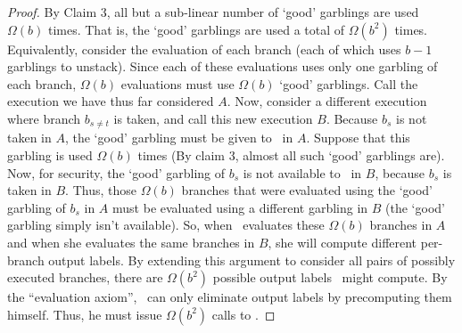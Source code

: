 \begin{proof}
By Claim 3, all but a sub-linear number of `good'
garblings are used $\Omega(b)$ times. That is, the `good' garblings are used a
total of $\Omega(b^2)$ times. Equivalently, consider the evaluation of each
branch (each of which uses $b-1$ garblings to unstack). Since each of these
evaluations uses only one garbling of each branch, $\Omega(b)$ evaluations
must use $\Omega(b)$ `good' garblings.  Call the execution we have thus far
considered $A$.
Now, consider a different execution where branch
$b_{s\neq t}$  is taken, and call this new execution $B$. Because $b_s$ is
not taken in $A$, the `good' garbling must be given to \Eval\ in $A$. Suppose
that this garbling is used $\Omega(b)$ times (By claim 3, almost all such
`good' garblings are). Now, for security, the `good' garbling of $b_s$ is
not available to \Eval\ in $B$, because $b_s$ is taken in $B$. Thus, those
$\Omega(b)$ branches that were evaluated using the `good' garbling of $b_s$
in $A$
must be evaluated using a different garbling in $B$ (the `good' garbling
simply isn’t available). So, when \Eval\ evaluates these $\Omega(b)$ branches
in $A$ and when she evaluates the same branches in $B$, she will compute
different per-branch output labels. By extending this argument to
consider all pairs of possibly executed branches, there are $\Omega(b^2)$
possible output labels \Eval\ might compute. By the “evaluation axiom”,
\Gen\ can only eliminate output labels by precomputing them himself.
Thus, he must issue $\Omega(b^2)$ calls to \Ev.
\end{proof}



